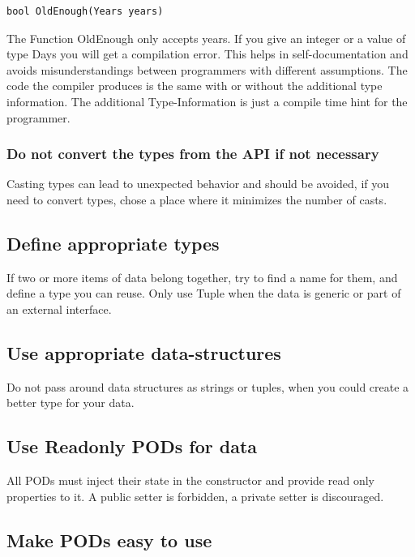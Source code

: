 \documentclass[11pt,a4paper]{article}
\begin{document}
\begin{lstlisting}[language={[Sharp]C}, caption={Use the new type}]
bool OldEnough(Years years)
\end{lstlisting}

The Function OldEnough only accepts years. If you give an integer or a value of type Days you will get a compilation error. This helps in self-documentation and avoids misunderstandings between programmers with different assumptions. The code the compiler produces is the same with or without the additional type information. The additional Type-Information is just a compile time hint for the programmer.

\subsubsection{Do not convert the types from the API if not necessary}

Casting types can lead to unexpected behavior and should be avoided, if you need to convert types, chose a place where it minimizes the number of casts.

\subsection{Define appropriate types}

If two or more items of data belong together, try to find a name for them, and define a type you can reuse. Only use Tuple when the data is generic or part of an external interface.

\subsection{Use appropriate data-structures}

Do not pass around data structures as strings or tuples, when you could create a better type for your data.

\subsection{Use Readonly PODs for data}

All PODs must inject their state in the constructor and provide read only properties to it.
A public setter is forbidden, a private setter is discouraged. 

\subsection{Make PODs easy to use}
\end{document}
